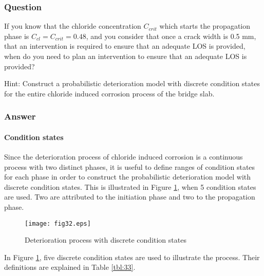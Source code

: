 \subsubsection{Question}
If you know that the chloride concentration ${C_{crit}}$ which starts the propagation phase is ${C_{cl}} = {C_{crit}} = 0.48$, and you consider that once a crack width is 0.5 mm, that an intervention is required to ensure that an adequate LOS is provided, when do you need to plan an intervention to ensure that an adequate LOS is provided? 

Hint: Construct a probabilistic deterioration model with discrete condition states for the entire chloride induced corrosion process of the bridge slab.
\subsubsection{Answer}
\paragraph{Condition states}
Since the deterioration process of chloride induced corrosion is a continuous process with two distinct phases, it is useful to define ranges of condition states for each phase in order to construct the probabilistic deterioration model with discrete condition states. This is illustrated in Figure \ref{fig:32}, when 5 condition states are used. Two are attributed to the initiation phase and two to the propagation phase.
\begin{figure}[h]
\texttt{[image: fig32.eps]}
\caption{Deterioration process with discrete condition states}\label{fig:32}
\end{figure}
In Figure \ref{fig:32}, five discrete condition states are used to illustrate the process. Their definitions are explained in Table \ref{tbl:33}.

